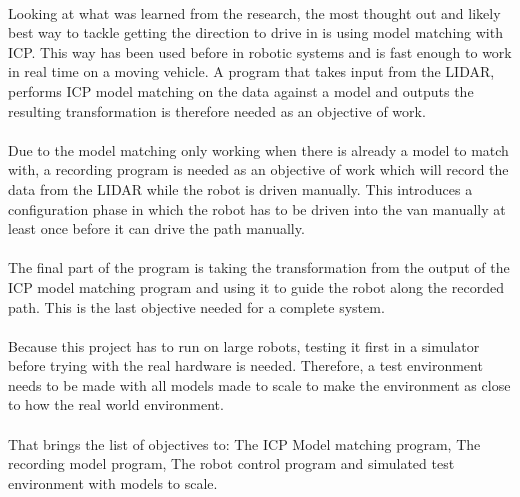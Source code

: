 \paragraph{}
Looking at what was learned from the research, the most thought out and likely best way to tackle getting the direction to drive in is using model matching with ICP. This way has been used before in robotic systems and is fast enough to work in real time on a moving vehicle. A program that takes input from the LIDAR, performs ICP model matching on the data against a model and outputs the resulting transformation is therefore needed as an objective of work.
\paragraph{}
Due to the model matching only working when there is already a model to match with, a recording program is needed as an objective of work which will record the data from the LIDAR while the robot is driven manually. This introduces a configuration phase in which the robot has to be driven into the van manually at least once before it can drive the path manually.
\paragraph{}
The final part of the program is taking the transformation from the output of the ICP model matching program and using it to guide the robot along the recorded path. This is the last objective needed for a complete system.
\paragraph{}
Because this project has to run on large robots, testing it first in a simulator before trying with the real hardware is needed. Therefore, a test environment needs to be made with all models made to scale to make the environment as close to how the real world environment.

\paragraph{}
That brings the list of objectives to: The ICP Model matching program, The recording model program, The robot control program and simulated test environment with models to scale.


